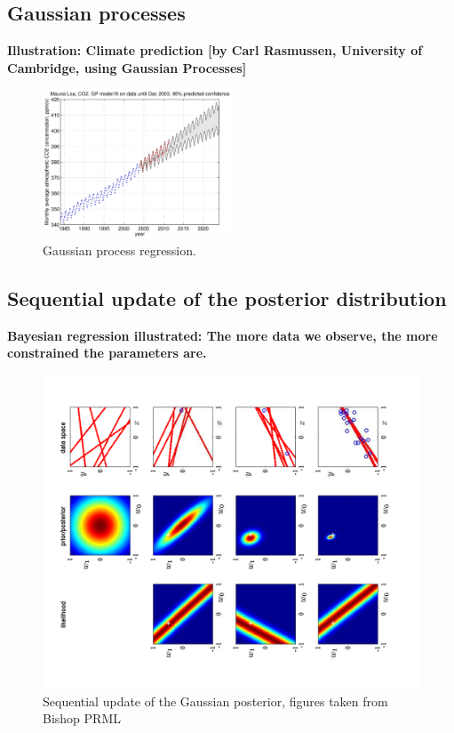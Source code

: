 \subsection{Gaussian processes}
\textbf{Illustration: Climate prediction [by Carl Rasmussen, University of Cambridge, using Gaussian Processes]}

\begin{figure}
	\centering
	\includegraphics[width=0.5\textwidth]{./lecture5/Rasmussen2}
	\caption{Gaussian process regression.}
\end{figure}


\subsection{Sequential update of the posterior distribution}
\textbf{Bayesian regression illustrated: The more data we observe, the more constrained the parameters are.}

\begin{figure}
	\includegraphics[width=\textwidth]{./lecture5/Figure37.pdf}
	\caption{Sequential update of the Gaussian posterior, figures taken from Bishop PRML}
\end{figure}



